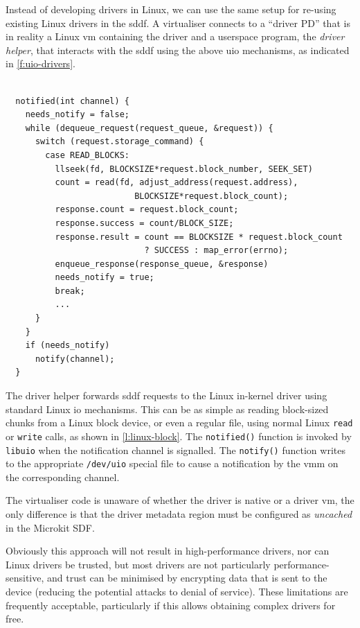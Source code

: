 \documentclass[a4paper,12pt]{report}
\newcommand{\code}[1]{\texttt{#1}}
\begin{document}
Instead of developing drivers in Linux, we can use the same setup for
re-using existing Linux drivers in the \gls{sddf}. A virtualiser connects to
a ``driver PD'' that is in reality a Linux \gls{vm} containing the
driver and a userspace program, the \emph{driver helper}, that
interacts with the \gls{sddf} using the above \gls{uio} mechanisms, as indicated
in \autoref{f:uio-drivers}.

\begin{lstlisting}[gobble=2,firstline=2,float=th,tabsize=2,
  label={l:linux-block},
  caption={[Example of Linux usermode driver helper.]Example of a
Linux usermode driver helper for a block device accessed via a regular Linux file (simplified).}]

  notified(int channel) {
    needs_notify = false;
    while (dequeue_request(request_queue, &request)) {
      switch (request.storage_command) {
        case READ_BLOCKS:
          llseek(fd, BLOCKSIZE*request.block_number, SEEK_SET)
          count = read(fd, adjust_address(request.address),
                          BLOCKSIZE*request.block_count);
          response.count = request.block_count;
          response.success = count/BLOCK_SIZE;
          response.result = count == BLOCKSIZE * request.block_count
                            ? SUCCESS : map_error(errno);
          enqueue_response(response_queue, &response)
          needs_notify = true;
          break;
          ...
      }
    }
    if (needs_notify)
      notify(channel);
  }
\end{lstlisting}

The driver helper forwards \gls{sddf} requests to the Linux in-kernel
driver using standard Linux \gls{io} mechanisms. This can be as simple
as reading block-sized chunks from a Linux block
device, or even a regular file, using normal Linux
\code{read} or \code{write} calls, as shown in
\autoref{l:linux-block}. The \code{notified()} function is invoked by
\code{libuio} when the notification channel is signalled. The
\code{notify()} function writes to the appropriate \code{/dev/uio}
special file to cause a notification by the \gls{vmm} on the corresponding
channel.

The virtualiser code is unaware of whether the driver is
native or a driver \gls{vm}, the only difference is that the driver metadata
region must be configured as \emph{uncached} in the Microkit SDF.

Obviously this approach will not result in high-performance drivers,
nor can Linux drivers be trusted, but most drivers are not
particularly performance-sensitive, and trust can be minimised by
encrypting data that is sent to the device (reducing the potential
attacks to denial of service). These limitations are frequently
acceptable, particularly if this allows obtaining complex drivers for
free.
\end{document}
